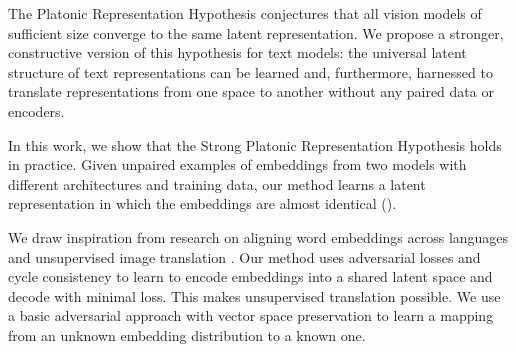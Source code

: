 

The Platonic Representation Hypothesis \citet{huh2024platonicrepresentationhypothesis} conjectures that all vision models of sufficient size converge to the same latent representation.  We propose a stronger, constructive version of this hypothesis for text models: the universal latent structure of text representations can be learned and, furthermore, harnessed to translate representations from one space to another without any paired data or encoders.

In this work, we show that the Strong Platonic Representation Hypothesis holds in practice.  Given unpaired examples of embeddings from two models with different architectures and training data, our method learns a latent representation in which the embeddings are almost identical ().

We draw inspiration from research on aligning word embeddings across languages \citep{xing2015normalized, conneau2018wordtranslationparalleldata, grave2018unsupervisedalignmentembeddingswasserstein, chen2018unsupervisedmultilingualwordembeddings} and unsupervised image translation
\citep{liu2018unsupervisedimagetoimagetranslationnetworks,zhu2020unpairedimagetoimagetranslationusing}. Our \atk{} method uses adversarial losses and cycle consistency to learn to encode embeddings into a shared latent space and decode with minimal loss.  This makes unsupervised translation possible.  We use a basic adversarial approach with vector space preservation \citep{mrksic2016counterfittingwordvectorslinguistic} to learn a mapping from an unknown embedding distribution to a known one.

